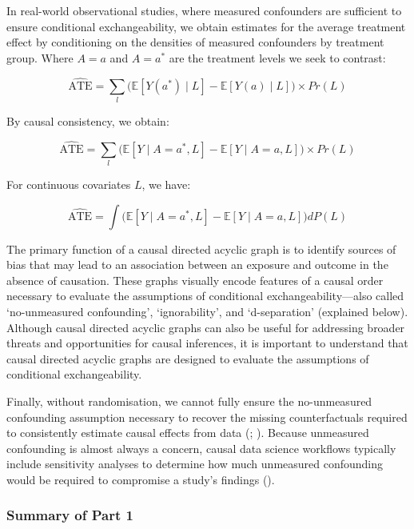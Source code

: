 \documentclass[
  single column]{article}
\begin{document}
In real-world observational studies, where measured confounders are
sufficient to ensure conditional exchangeability, we obtain estimates
for the average treatment effect by conditioning on the densities of
measured confounders by treatment group. Where \(A = a\) and \(A = a^*\)
are the treatment levels we seek to contrast:

\[
\widehat{\text{ATE}} =  \sum_l \big( \mathbb{E}[Y(a^*) \mid L] - \mathbb{E}[Y(a) \mid L] \big) \times Pr(L)
\]

By causal consistency, we obtain:

\[
\widehat{\text{ATE}} =  \sum_l \big( \mathbb{E}[Y \mid A = a^*, L] - \mathbb{E}[Y \mid A = a, L] \big) \times Pr(L)
\]

For continuous covariates \(L\), we have:

\[
\widehat{\text{ATE}} = \int \big( \mathbb{E}[Y \mid A = a^*, L] - \mathbb{E}[Y \mid A = a, L] \big) dP(L)
\]

The primary function of a causal directed acyclic graph is to identify
sources of bias that may lead to an association between an exposure and
outcome in the absence of causation. These graphs visually encode
features of a causal order necessary to evaluate the assumptions of
conditional exchangeability---also called `no-unmeasured confounding',
`ignorability', and `d-separation' (explained below). Although causal
directed acyclic graphs can also be useful for addressing broader
threats and opportunities for causal inferences, it is important to
understand that causal directed acyclic graphs are designed to evaluate
the assumptions of conditional exchangeability.

Finally, without randomisation, we cannot fully ensure the no-unmeasured
confounding assumption necessary to recover the missing counterfactuals
required to consistently estimate causal effects from data
(;
). Because
unmeasured confounding is almost always a concern, causal data science
workflows typically include sensitivity analyses to determine how much
unmeasured confounding would be required to compromise a study's
findings ().

\subsubsection{Summary of Part 1}\label{summary-of-part-1}
\end{document}
